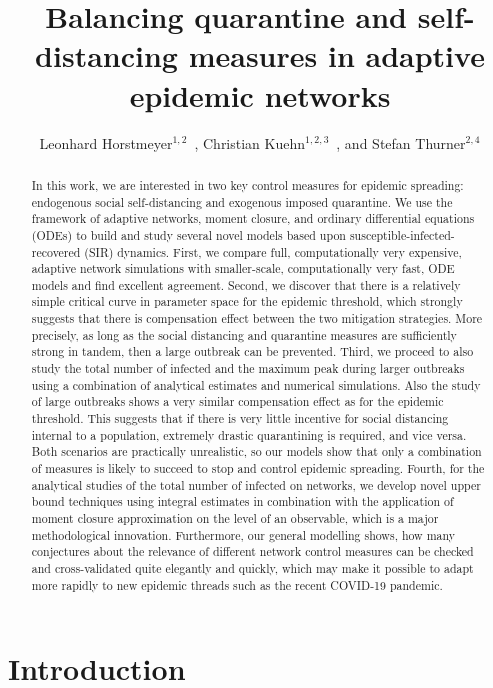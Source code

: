 \documentclass[12pt]{article}
\title{Balancing quarantine and self-distancing measures in adaptive epidemic networks}
\author{Leonhard Horstmeyer$^{1,2}$~, Christian Kuehn$^{1,2,3}$~, and Stefan Thurner$^{2,4}$}
\date{}
\begin{document}
\maketitle

\begin{abstract}
In this work, we are interested in two key control measures for epidemic spreading: endogenous social self-distancing and exogenous imposed quarantine. We use the framework of adaptive networks, moment closure, and ordinary differential equations (ODEs) to build and study several novel models based upon susceptible-infected-recovered (SIR) dynamics. First, we compare full, computationally very expensive, adaptive network simulations with smaller-scale, computationally very fast, ODE models and find excellent agreement. Second, we discover that there is a relatively simple critical curve in parameter space for the epidemic threshold, which strongly suggests that there is compensation effect between the two mitigation strategies. More precisely, as long as the social distancing and quarantine measures are sufficiently strong in tandem, then a large outbreak can be prevented. Third, we proceed to also study the total number of infected and the maximum peak during larger outbreaks using a combination of analytical estimates and numerical simulations. Also the study of large outbreaks shows a very similar compensation effect as for the epidemic threshold. This suggests that if there is very little incentive for social distancing internal to a population, extremely drastic quarantining is required, and vice versa. Both scenarios are practically unrealistic, so our models show that only a combination of measures is likely to succeed to stop and control epidemic spreading. Fourth, for the analytical studies of the total number of infected on networks, we develop novel upper bound techniques using integral estimates in combination with the application of moment closure approximation on the level of an observable, which is a major methodological innovation. Furthermore, our general modelling shows, how many conjectures about the relevance of different network control measures can be checked and cross-validated quite elegantly and quickly, which may make it possible to adapt more rapidly to new epidemic threads such as the recent COVID-19 pandemic.  
\end{abstract}

\newpage
\section{Introduction}
\label{sec:intro}
\end{document}
